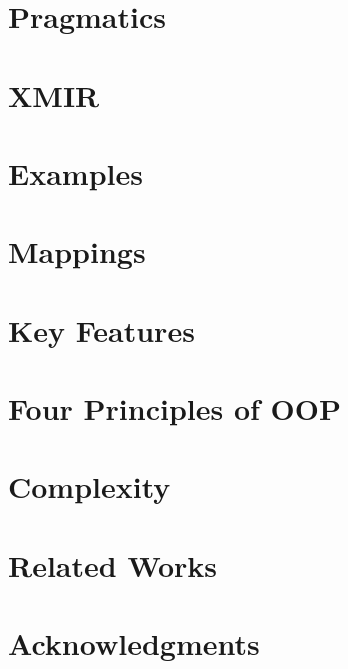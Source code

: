 \documentclass[sigplan,nonacm=true]{acmart}
\begin{document}
\section{Pragmatics}
\label{sec:pragmatics}


\section{XMIR}
\label{sec:xmir}


\section{Examples}
\label{sec:examples}


\section{Mappings}
\label{sec:mappings}


\section{Key Features}
\label{sec:features}


\section{Four Principles of OOP}
\label{sec:four}


\section{Complexity}
\label{sec:complexity}


\section{Related Works}
\label{sec:related}


\section{Acknowledgments}



\raggedright

\clearpage
\end{document}
